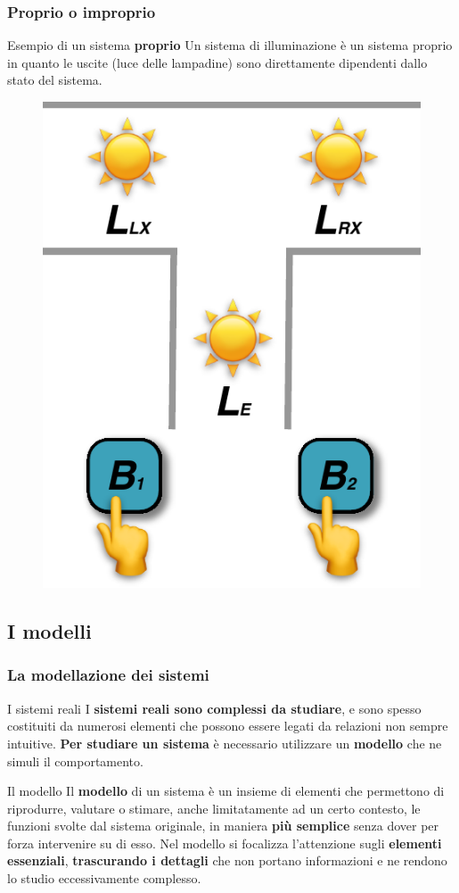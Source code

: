 \begin{frame}
	\frametitle{Proprio o improprio}
	
	\begin{block}{Esempio di un sistema \textbf{proprio}}
		Un sistema di illuminazione è un sistema proprio in quanto le uscite (luce delle lampadine) sono direttamente dipendenti dallo stato del sistema.	
		
		\begin{figure}[!htbp]
			\centering 
			\includegraphics[width=0.3\linewidth]{images/1_i_sistemi/sistemaLight.pdf}
		\end{figure}
	\end{block}
	
	
\end{frame}



\subsection[I modelli]{I modelli}
\begin{frame}
	\frametitle{La modellazione dei sistemi}
	\begin{block}{I sistemi reali}
		I \textbf{sistemi reali sono complessi da studiare}, e sono spesso costituiti da numerosi elementi che possono essere legati da relazioni non sempre intuitive.
		\textbf{Per studiare un sistema} è necessario utilizzare un \textbf{modello} che ne simuli il comportamento. 
	\end{block}
	
	\begin{block}{Il modello}
		Il \textbf{modello} di un sistema è un insieme di elementi che permettono di riprodurre, valutare o stimare, anche limitatamente ad un certo contesto, le funzioni svolte dal sistema originale, in maniera \textbf{più semplice} senza dover per forza intervenire su di esso.
		Nel modello si focalizza l’attenzione sugli \textbf{elementi essenziali}, \textbf{trascurando i dettagli} che non portano informazioni e ne rendono lo studio eccessivamente complesso.
	\end{block}
	
	
\end{frame}


